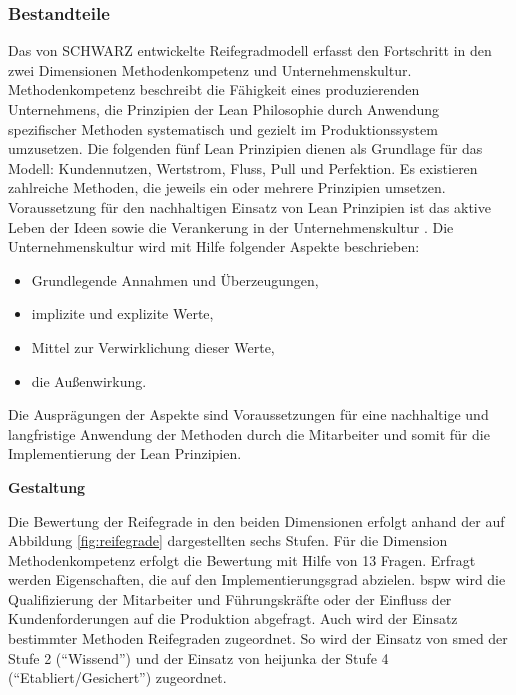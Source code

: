 \subsubsection{Bestandteile}
Das von SCHWARZ entwickelte Reifegradmodell erfasst den Fortschritt in den zwei Dimensionen Methodenkompetenz und Unternehmenskultur. 
Methodenkompetenz beschreibt die Fähigkeit eines produzierenden Unternehmens, die Prinzipien der Lean Philosophie durch Anwendung spezifischer Methoden systematisch und gezielt im Produktionssystem umzusetzen. 
Die folgenden fünf Lean Prinzipien dienen als Grundlage für das Modell: Kundennutzen, Wertstrom, Fluss, Pull und Perfektion. 
Es existieren zahlreiche Methoden, die jeweils ein oder mehrere Prinzipien umsetzen. 
%
Voraussetzung für den nachhaltigen Einsatz von Lean Prinzipien ist das aktive Leben der Ideen sowie die Verankerung in der Unternehmenskultur \autocite{Baumgaertner2006}. 
% 
Die Unternehmenskultur wird mit Hilfe folgender Aspekte beschrieben: 
\begin{itemize}
\item Grundlegende Annahmen und Überzeugungen,
\item implizite und explizite Werte, 
\item Mittel zur Verwirklichung dieser Werte,
\item die Außenwirkung.
\end{itemize}
Die Ausprägungen der Aspekte sind Voraussetzungen für eine nachhaltige und langfristige Anwendung der Methoden durch die Mitarbeiter und somit für die Implementierung der Lean Prinzipien. 

\textbf{Gestaltung}

Die Bewertung der Reifegrade in den beiden Dimensionen erfolgt anhand der auf Abbildung \ref{fig:reifegrade} dargestellten sechs Stufen. 
%
Für die Dimension Methodenkompetenz erfolgt die Bewertung mit Hilfe von 13 Fragen. Erfragt werden Eigenschaften, die auf den Implementierungsgrad abzielen. \Gls{bspw} wird die Qualifizierung der Mitarbeiter und Führungskräfte oder der Einfluss der Kundenforderungen auf die Produktion abgefragt. 
Auch wird der Einsatz bestimmter Methoden Reifegraden zugeordnet. So wird der Einsatz von \gls{smed} der Stufe 2 (``Wissend'') und der Einsatz von \gls{heijunka} der Stufe 4 (``Etabliert/Gesichert'') zugeordnet. 

